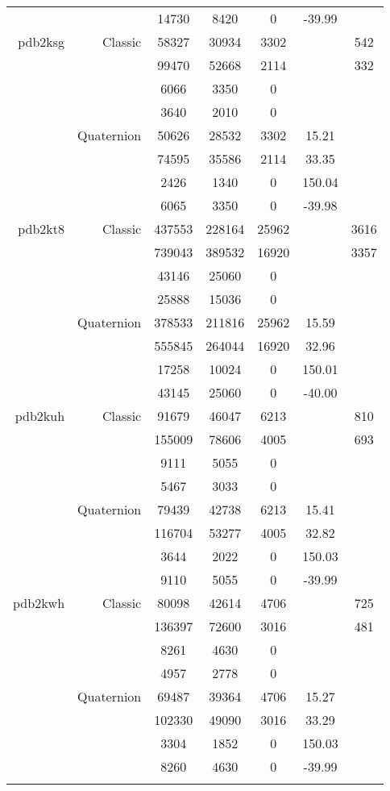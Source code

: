 \begin{xltabular}{\textwidth}{r|rcccSc}
& & 14730 & 8420 & 0 & -39.99 & \\ \addlinespace
pdb2ksg & Classic & 58327 & 30934 & 3302 & & 542 \\
& & 99470 & 52668 & 2114 & & 332 \\
& & 6066 & 3350 & 0 & & \\
& & 3640 & 2010 & 0 & & \\
& Quaternion & 50626 & 28532 & 3302 & 15.21 & \\
& & 74595 & 35586 & 2114 & 33.35 & \\
& & 2426 & 1340 & 0 & 150.04 & \\
& & 6065 & 3350 & 0 & -39.98 & \\ \addlinespace
pdb2kt8 & Classic & 437553 & 228164 & 25962 & & 3616 \\
& & 739043 & 389532 & 16920 & & 3357 \\
& & 43146 & 25060 & 0 & & \\
& & 25888 & 15036 & 0 & & \\
& Quaternion & 378533 & 211816 & 25962 & 15.59 & \\
& & 555845 & 264044 & 16920 & 32.96 & \\
& & 17258 & 10024 & 0 & 150.01 & \\
& & 43145 & 25060 & 0 & -40.00 & \\ \addlinespace
pdb2kuh & Classic & 91679 & 46047 & 6213 & & 810 \\
& & 155009 & 78606 & 4005 & & 693 \\
& & 9111 & 5055 & 0 & & \\
& & 5467 & 3033 & 0 & & \\
& Quaternion & 79439 & 42738 & 6213 & 15.41 & \\
& & 116704 & 53277 & 4005 & 32.82 & \\
& & 3644 & 2022 & 0 & 150.03 & \\
& & 9110 & 5055 & 0 & -39.99 & \\ \addlinespace
pdb2kwh & Classic & 80098 & 42614 & 4706 & & 725 \\
& & 136397 & 72600 & 3016 & & 481 \\
& & 8261 & 4630 & 0 & & \\
& & 4957 & 2778 & 0 & & \\
& Quaternion & 69487 & 39364 & 4706 & 15.27 & \\
& & 102330 & 49090 & 3016 & 33.29 & \\
& & 3304 & 1852 & 0 & 150.03 & \\
& & 8260 & 4630 & 0 & -39.99 & \\ \addlinespace

\end{xltabular}
